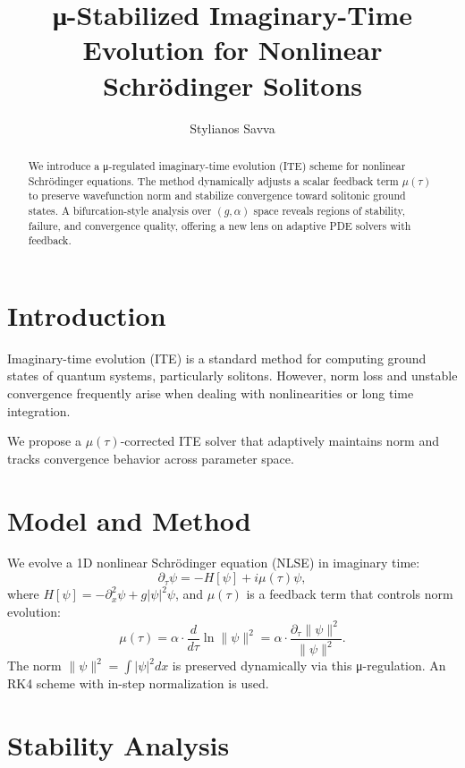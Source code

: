 \documentclass[11pt]{article}
\title{μ-Stabilized Imaginary-Time Evolution for Nonlinear Schrödinger Solitons}
\author{Stylianos Savva}
\date{}
\begin{document}
\maketitle

\begin{abstract}
We introduce a μ-regulated imaginary-time evolution (ITE) scheme for nonlinear Schrödinger equations. The method dynamically adjusts a scalar feedback term $\mu(\tau)$ to preserve wavefunction norm and stabilize convergence toward solitonic ground states. A bifurcation-style analysis over $(g, \alpha)$ space reveals regions of stability, failure, and convergence quality, offering a new lens on adaptive PDE solvers with feedback.  
\end{abstract}

\section{Introduction}

Imaginary-time evolution (ITE) is a standard method for computing ground states of quantum systems, particularly solitons. However, norm loss and unstable convergence frequently arise when dealing with nonlinearities or long time integration. 

We propose a $\mu(\tau)$-corrected ITE solver that adaptively maintains norm and tracks convergence behavior across parameter space.

\section{Model and Method}

We evolve a 1D nonlinear Schrödinger equation (NLSE) in imaginary time:
\begin{equation}
\partial_\tau \psi = -H[\psi] + i \mu(\tau) \psi,
\end{equation}
where $H[\psi] = -\partial_x^2 \psi + g |\psi|^2 \psi$, and $\mu(\tau)$ is a feedback term that controls norm evolution:
\begin{equation}
\mu(\tau) = \alpha \cdot \frac{d}{d\tau} \ln \|\psi\|^2 = \alpha \cdot \frac{\partial_\tau \|\psi\|^2}{\|\psi\|^2}.
\end{equation}
The norm $\|\psi\|^2 = \int |\psi|^2 dx$ is preserved dynamically via this μ-regulation. An RK4 scheme with in-step normalization is used.

\section{Stability Analysis}
\end{document}
